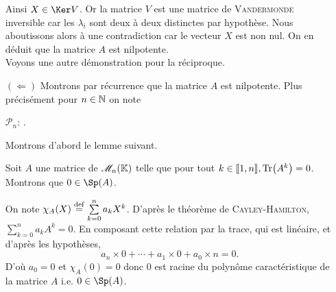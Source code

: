 \begin{preuve}
\begin{itemize}

         Ainsi $X \in \Ker V$. Or la matrice $V$ est une matrice de \textsc{Vandermonde} inversible car les $\lambda_i$ sont deux à deux distinctes \note \marginnote[0cm]{\textcolor{red}{renvoyer vers la section sur Vandermonde}} par hypothèse. Nous aboutissons alors à une contradiction car le vecteur $X$ est non nul. On en déduit que la matrice $A$ est nilpotente. \\
        
        Voyons une autre démonstration pour la réciproque. \\ 
        \item[$(\Leftarrow)$] Montrons par récurrence que la matrice $A$ est nilpotente. Plus précisément pour $n \in \mathbb{N}$ on note
        \begin{center}
            $\mathscr{P}_n$: .
        \end{center}
        Montrons d'abord le lemme suivant.
        \begin{lemme}
            Soit $A$ une matrice de $\mathscr{M}_n(\mathbb{K})$ telle que pour tout $k \in \llbracket 1, n \rrbracket, \Tr(A^k) = 0$. Montrons que $0 \in \Sp(A)$.
        \end{lemme}
        On note $\chi_A(X) \overset{\mathrm{\tiny def}}{=} \sum\limits_{k=0}^n a_k X^k$. D'après le théorème de \textsc{Cayley}-\textsc{Hamilton}, $\sum\limits_{k=0}^n a_k A^k = 0$. En composant cette relation par la trace, qui est linéaire, et d'après les hypothèses, 
        $$a_n \times 0 + \cdots + a_1 \times 0 + a_0 \times n = 0.$$
        D'où $a_0 = 0$ et $\chi_A(0) = 0$ donc $0$ est racine du polynôme caractéristique de la matrice $A$ i.e. $0 \in \Sp(A)$. \\
        

\end{itemize}
\end{preuve}
